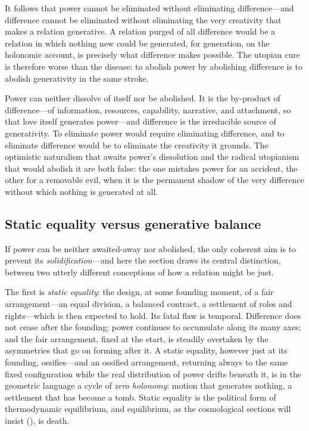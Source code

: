 It follows that power cannot be eliminated without eliminating difference---and difference cannot be eliminated without eliminating the very creativity that makes a relation generative. A relation purged of all difference would be a relation in which nothing new could be generated, for generation, on the holonomic account, is precisely what difference makes possible. The utopian cure is therefore worse than the disease: to abolish power by abolishing difference is to abolish generativity in the same stroke.

\begin{claim}
Power can neither dissolve of itself nor be abolished. It is the by-product of difference---of information, resources, capability, narrative, and attachment, so that love itself generates power---and difference is the irreducible source of generativity. To eliminate power would require eliminating difference, and to eliminate difference would be to eliminate the creativity it grounds. The optimistic naturalism that awaits power's dissolution and the radical utopianism that would abolish it are both false: the one mistakes power for an accident, the other for a removable evil, when it is the permanent shadow of the very difference without which nothing is generated at all.
\end{claim}

\subsection{Static equality versus generative balance}
\label{p17:sub:balance-static}

If power can be neither awaited-away nor abolished, the only coherent aim is to prevent its \emph{solidification}---and here the section draws its central distinction, between two utterly different conceptions of how a relation might be just.

The first is \emph{static equality}: the design, at some founding moment, of a fair arrangement---an equal division, a balanced contract, a settlement of roles and rights---which is then expected to hold. Its fatal flaw is temporal. Difference does not cease after the founding; power continues to accumulate along its many axes; and the fair arrangement, fixed at the start, is steadily overtaken by the asymmetries that go on forming after it. A static equality, however just at its founding, ossifies---and an ossified arrangement, returning always to the same fixed configuration while the real distribution of power drifts beneath it, is in the geometric language a cycle of \emph{zero holonomy}: motion that generates nothing, a settlement that has become a tomb. Static equality is the political form of thermodynamic equilibrium, and equilibrium, as the cosmological sections will insist (), is death.

